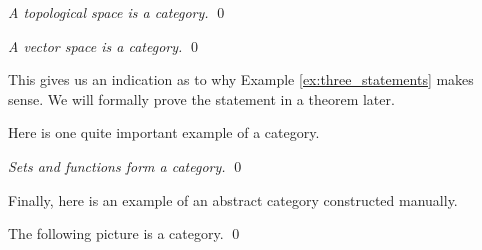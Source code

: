 \documentclass[../thesis.tex]{subfiles}
\begin{document}
\begin{ex}
\label{ex:topological_space}
\textit{A topological space is a category.}
\qed
\end{ex}

\begin{ex}
\label{ex:vector_space}
\textit{A vector space is a category.}
\qed
\end{ex}

This gives us an indication as to why Example \ref{ex:three_statements} makes sense.
We will formally prove the statement in a theorem later.

Here is one quite important example of a category.

\begin{ex}
\label{ex:set}
\textit{Sets and functions form a category.}
\qed
\end{ex}

Finally, here is an example of an abstract category constructed manually.

\begin{ex}
\label{ex:arrow}
The following picture is a category.
\qed
\end{ex}
\end{document}
